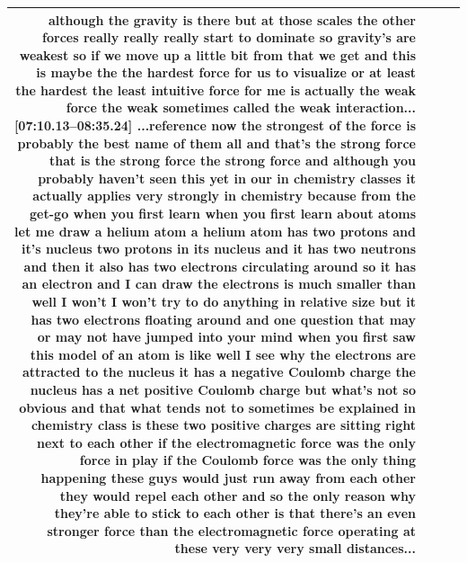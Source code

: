 \documentclass[10pt]{article}
\begin{document}
\begin{tiny}
\begin{longtable}{|r|p{0.375in}|p{1.275in}|p{3.5in}|}
although the gravity is there but at those scales the other forces really really really start to dominate so gravity's are weakest so if we move up a little bit from that we get and this is maybe the the hardest force for us to visualize or at least the hardest the least intuitive force for me is actually the weak force the weak sometimes called the weak interaction...\newline\textbf{[07:10.13--08:35.24]} ...reference now the strongest of the force is probably the best name of them all and that's the strong force that is the strong force the strong force and although you probably haven't seen this yet in our in chemistry classes it actually applies very strongly in chemistry because from the get-go when you first learn when you first learn about atoms let me draw a helium atom a helium atom has two protons and it's nucleus two protons in its nucleus and it has two neutrons and then it also has two electrons circulating around so it has an electron and I can draw the electrons is much smaller than well I won't I won't try to do anything in relative size but it has two electrons floating around and one question that may or may not have jumped into your mind when you first saw this model of an atom is like well I see why the electrons are attracted to the nucleus it has a negative Coulomb charge the nucleus has a net positive Coulomb charge but what's not so obvious and that what tends not to sometimes be explained in chemistry class is these two positive charges are sitting right next to each other if the electromagnetic force was the only force in play if the Coulomb force was the only thing happening these guys would just run away from each other they would repel each other and so the only reason why they're able to stick to each other is that there's an even stronger force than the electromagnetic force operating at these very very very small distances... \\\hline

\end{longtable}
\end{tiny}
\end{document}
